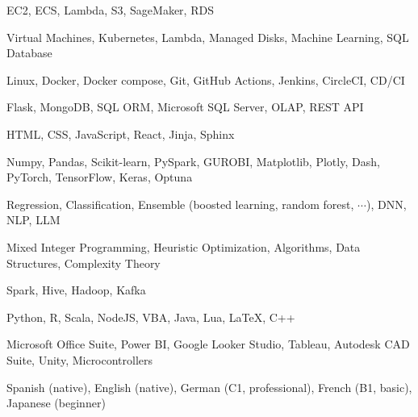 

\begin{cvskills}

	{EC2, ECS, Lambda, S3, SageMaker, RDS} %

	{Virtual Machines, Kubernetes, Lambda, Managed Disks, Machine Learning, SQL Database} %

	{Linux, Docker, Docker compose, Git, GitHub Actions, Jenkins, CircleCI, CD/CI} %

	{Flask, MongoDB, SQL ORM, Microsoft SQL Server, OLAP, REST API} %

	{HTML, CSS, JavaScript, React, Jinja, Sphinx} %

	{Numpy, Pandas, Scikit-learn, PySpark, GUROBI, Matplotlib, Plotly, Dash, PyTorch, TensorFlow, Keras, Optuna} %

	{Regression, Classification, Ensemble (boosted learning, random forest, \(\cdots\)), DNN, NLP, LLM} %

	{Mixed Integer Programming, Heuristic Optimization, Algorithms, Data Structures, Complexity Theory} %

	{Spark, Hive, Hadoop, Kafka} %

	{Python, R, Scala, NodeJS, VBA, Java, Lua, LaTeX, C++} %

	{Microsoft Office Suite, Power BI, Google Looker Studio, Tableau, Autodesk CAD Suite, Unity, Microcontrollers} %

	{Spanish (native), English (native), German (C1, professional), French (B1, basic), Japanese (beginner)} %

\end{cvskills}
